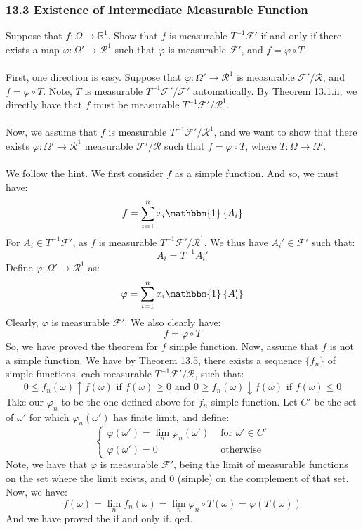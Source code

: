 \documentclass[12pt,a4paper]{article}
\newcommand{\1}[1]{\mathbbm{1}\left\{ #1 \right\}}
\newcommand{\R}{\mathbb{R}}
\newcommand{\fcal}{\mathcal{F}}
\newcommand{\rcal}{\mathcal{R}}
\begin{document}
\subsubsection{13.3 Existence of Intermediate Measurable Function} Suppose that $f: \Omega \to \R^1$. Show that $f$ is measurable $T^{-1}\fcal'$ if and only if there exists a map $\varphi: \Omega' \to \rcal^1$ such that $\varphi$ is measurable $\fcal'$, and $f = \varphi \circ T$.
\\\\
First, one direction is easy. Suppose that $\varphi: \Omega' \to \rcal^1$ is measurable $\fcal'/\rcal$, and $f = \varphi \circ T$. Note, $T$ is measurable $T^{-1}\fcal'/\fcal'$ automatically. By Theorem 13.1.ii, we directly have that $f$ must be measurable $T^{-1}\fcal'/\rcal^1$.
\\\\
Now, we assume that $f$ is measurable $T^{-1}\fcal'/\rcal^1$, and we want to show that there exists $\varphi: \Omega' \to \rcal^1$ measurable $\fcal'/\rcal$ such that $f = \varphi \circ T$, where $T: \Omega \to \Omega'$. 
\\\\
We follow the hint. We first consider $f$ as a simple function. And so, we must have:
$$
f = \sum_{i=1}^n x_i \1{A_i}
$$
For $A_i \in T^{-1}\fcal'$, as $f$ is measurable $T^{-1}\fcal'/\rcal^1$. We thus have $A_i' \in \fcal'$ such that:
$$
A_i = T^{-1}A_i'
$$
Define $\varphi: \Omega' \to \rcal^1$ as:
$$
\varphi = \sum_{i=1}^n x_i \1{A_i'}
$$
Clearly, $\varphi$ is measurable $\fcal'$. We also clearly have:
$$
	f = \varphi \circ T
$$
So, we have proved the theorem for $f$ simple function. Now, assume that $f$ is not a simple function. We have by Theorem 13.5, there exists a sequence $\{f_n\}$ of simple functions, each measurable $T^{-1}\fcal'/\rcal$, such that:
$$
	0 \leq f_n(\omega) \uparrow f(\omega) \text{ if $f(\omega) \geq 0$ and }
	0 \geq f_n(\omega) \downarrow f(\omega) \text{ if $f(\omega) \leq 0$}
$$
Take our $\varphi_n$ to be the one defined above for $f_n$ simple function. Let $C'$ be the set of $\omega'$ for which $\varphi_n(\omega')$ has finite limit, and define:
$$
	\begin{cases}
		\varphi(\omega') = \lim_n \varphi_n(\omega') & \text{ for $\omega' \in C'$}\\
		\varphi(\omega') = 0 & \text{ otherwise}
	\end{cases}
$$
Note, we have that $\varphi$ is measurable $\fcal'$, being the limit of measurable functions on the set where the limit exists, and 0 (simple) on the complement of that set. Now, we have:
$$
	f(\omega) = \lim_n f_n(\omega) = \lim_n \varphi_n \circ T(\omega) = \varphi(T(\omega))
$$
And we have proved the if and only if. qed.
\end{document}
